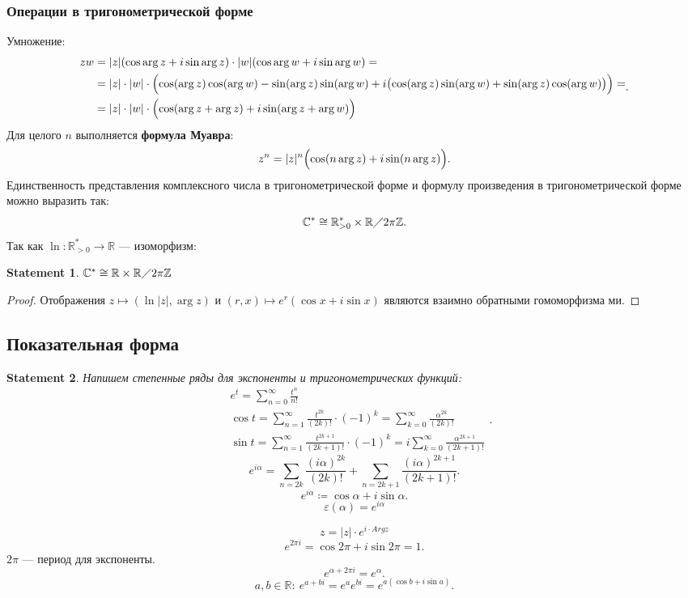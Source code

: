 \documentclass[11pt]{book}
\newcommand{\Z}{\mathbb{Z}}
\newcommand{\R}{\mathbb{R}}
\newcommand{\Cm}{\mathbb{C}}
\newcommand{\slim}{\sum\limits}
\newcommand{\po}{\diagup}
\theoremstyle{definition}
\theoremstyle{plain}
\theoremstyle{plain}
\newtheorem{st}{Statement}
\theoremstyle{definition}
\theoremstyle{remark}
\begin{document}
\subsubsection{Операции в тригонометрической форме}
Умножение:
\[
    \begin{aligned}
	zw &= |z|(\cos \arg z + i \sin \arg z) \cdot |w|(\cos \arg w + i \sin \arg w) = \\
	   &= |z|\cdot |w| \cdot \Bigl( \cos (\arg z) \cos  ( \arg w) - \sin(\arg z) \sin(\arg w)  
	   + i\bigl(\cos (\arg z) \sin(\arg w) + \sin (\arg z) \cos(\arg w)\bigr)\Bigr)  = \\
	   & = |z| \cdot |w| \cdot \Bigl( \cos (\arg z + \arg z) + i \sin (\arg z + \arg w)\Bigr)
    \end{aligned}
.\]
Для целого $ n$ выполняется {\bf формула Муавра}:
 \[
     z^{n} = |z|^{n} \Bigl( \cos (n \arg z) + i \sin(n \arg z)\Bigr)
.\] 
Единственность представления  комплексного числа в тригонометрической форме и формулу произведения в тригонометрической форме можно выразить так:
\[
    \Cm^{*} \cong \R_{>0}^{*} \times \R \po 2 \pi\Z
.\] 
Так как $ \ln : \R_{>0}^{*} \to  \R$ --- изоморфизм:
\begin{st}
    $ \Cm^{*} \cong \R \times \R \po 2 \pi \Z$
\end{st}
\begin{proof}
    Отображения $ z \mapsto (\ln |z|, \arg z)$ и $ (r, x) \mapsto e^{r}(\cos x + i \sin x)$ являются взаимно обратными гомоморфизма ми.
\end{proof}
\subsection{Показательная форма}
\begin{st}
    Напишем степенные ряды для экспоненты и тригонометрических функций:
    \[
	\begin{aligned}
	    & e^{t} = \slim_{n=0}^{\infty} \frac{t ^{n}}{n!}\\
	    & \cos t = \slim_{n=1}^{ \infty} \frac{t ^{2k}}{(2k)!} \cdot (-1)^{k} = \slim_{k=0}^{\infty} \frac{ \alpha ^{2k}}{(2k)!}\\
	    & \sin t = \slim_{n=1}^{ \infty} \frac{t ^{2k+1}}{(2k+1)!} \cdot (-1)^{k} = i\slim_{k=0}^{\infty} \frac{ \alpha ^{2k+1}}{(2k+1)!}
    \end{aligned} 
    .\] 
    \[
	e ^{i \alpha} = \slim_{n= 2k} \frac{(i\alpha)^{2k}}{(2k)!} + \slim_{n= 2k+1}\frac{(i \alpha )^{2k+1}}{(2k+1)!} %
    .\] 
    \[
    e ^{i \alpha} \coloneqq \cos \alpha + i \sin \alpha 
    .\] 
    $$ \varepsilon  ( \alpha ) = e ^{i \alpha }$$
\end{st}
\begin{defn}
    $$z = |z| \cdot e ^{i \cdot Arg z}$$
    \[
    e^{2\pi i} = \cos 2\pi + i \sin 2\pi = 1
    .\] 
    $2
    \pi$ --- период для экспоненты.
    \[
    e ^{\alpha + 2\pi i} = e^{ \alpha }
    .\] 
    \[
	a, b \in  \R: ~ e^{a + bi} = e ^{ a} e ^{bi} = e^{a ( \cos b + i \sin a)}    
    .\]
\end{defn}
\end{document}
